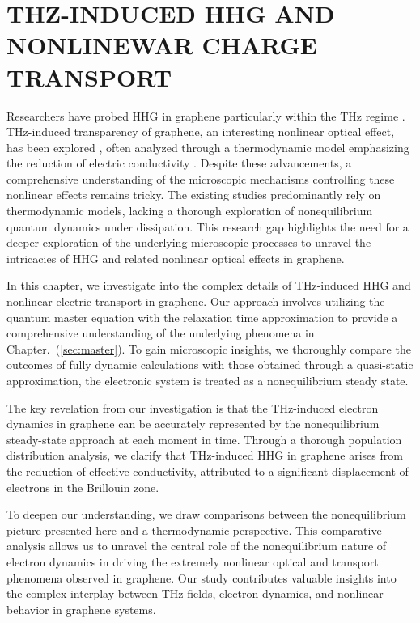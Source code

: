 \chapter{THZ-INDUCED HHG AND NONLINEWAR CHARGE TRANSPORT \label{ch:ch4}}

Researchers have probed HHG in graphene particularly within the  THz regime \cite{hafez2018extremely,kovalev2021electrical}. THz-induced transparency of graphene, an interesting nonlinear optical effect, has been explored \cite{Hwang2013,Paul_2013,doi:10.1063/1.4902999}, often analyzed through a thermodynamic model emphasizing the reduction of electric conductivity \cite{mics2015thermodynamic,kovalev2021electrical}.
Despite these advancements, a comprehensive understanding of the microscopic mechanisms controlling these nonlinear effects remains tricky. The existing studies predominantly rely on thermodynamic models, lacking a thorough exploration of nonequilibrium quantum dynamics under dissipation. This research gap highlights the need for a deeper exploration of the underlying microscopic processes to unravel the intricacies of HHG and related nonlinear optical effects in graphene.

In this chapter, we investigate into the complex details of  THz-induced \gls{HHG} and nonlinear electric transport in graphene. Our approach involves utilizing the quantum master equation with the relaxation time approximation to provide a comprehensive understanding of the underlying phenomena in Chapter.~(\ref{sec:master}). To gain microscopic insights, we thoroughly compare the outcomes of fully dynamic calculations with those obtained through a quasi-static approximation,  the electronic system is treated as a nonequilibrium steady state.

The key revelation from our investigation is that the THz-induced electron dynamics in graphene can be accurately represented by the nonequilibrium steady-state approach at each moment in time. Through a thorough population distribution analysis, we clarify that THz-induced HHG in graphene arises from the reduction of effective conductivity, attributed to a significant displacement of electrons in the Brillouin zone.

To deepen our understanding, we draw comparisons between the nonequilibrium picture presented here and a thermodynamic perspective. This comparative analysis allows us to unravel the central role of the nonequilibrium nature of electron dynamics in driving the extremely nonlinear optical and transport phenomena observed in graphene. Our study contributes valuable insights into the complex interplay between THz fields, electron dynamics, and nonlinear behavior in graphene systems.

